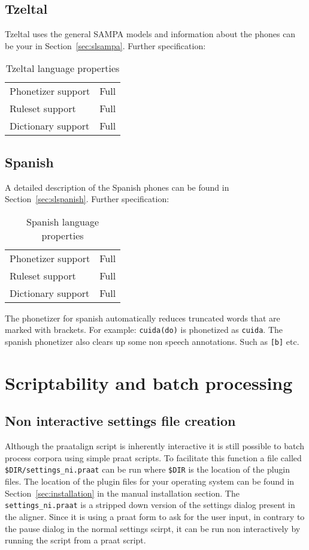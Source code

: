 \subsection{Tzeltal}
Tzeltal uses the general SAMPA models and information about the phones can be
your in Section~\ref{sec:slsampa}. Further specification:
\begin{table}[H]
	\caption{Tzeltal language properties}
	\begin{tabular}{ll}
		Phonetizer support & Full\\
		Ruleset support & Full\\
		Dictionary support & Full
	\end{tabular}
\end{table}

\subsection{Spanish}
A detailed description of the Spanish phones can be found in
Section~\ref{sec:slspanish}. Further specification:
\begin{table}[H]
	\caption{Spanish language properties}
	\begin{tabular}{ll}
		Phonetizer support & Full\\
		Ruleset support & Full\\
		Dictionary support & Full
	\end{tabular}
\end{table}

The phonetizer for spanish automatically reduces truncated words that are
marked with brackets. For example: \texttt{cuida(do)} is phonetized as
\texttt{cuida}. The spanish phonetizer also clears up some non speech
annotations. Such as \texttt{[b]} etc.

\section{Scriptability and batch processing}
\subsection{Non interactive settings file creation}
Although the praatalign script is inherently interactive it is still possible
to batch process corpora using simple praat scripts. To facilitate this
function a file called \texttt{\$DIR/settings\_ni.praat} can be run where
\texttt{\$DIR} is the location of the plugin files. The location of the plugin
files for your operating system can be found in Section~\ref{sec:installation}
in the manual installation section. The \texttt{settings\_ni.praat} is a
stripped down version of the settings dialog present in the aligner. Since it
is using a praat form to ask for the user input, in contrary to the pause
dialog in the normal settings scirpt, it can be run non interactively by
running the script from a praat script.

